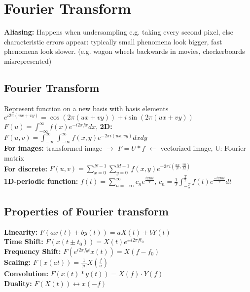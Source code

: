 \section*{Fourier Transform}
\textbf{Aliasing:} Happens when undersampling e.g. taking every second pixel, else characteristic errors appear: typically small phenomena look bigger, fast phenomena look slower. (e.g. wagon wheels backwards in movies, checkerboards misrepresented)
\subsection*{Fourier Transform}
Represent function on a new basis with basis elements $e^{i 2 \pi (ux + vy)} = \cos(2 \pi (ux + vy)) + i \sin(2 \pi (ux + vy))$\\
$F(u) = \int_{-\infty}^{\infty} f(x) e^{-i 2 \pi fx} dx$, \textbf{2D:} $F(u, v) = \int_{-\infty}^{\infty} \int_{-\infty}^{\infty} f(x, y) e^{-2\pi i (ux, vy)}dx dy$\\
\textbf{For images:} transformed image $\rightarrow$ $F = U * f$ $\leftarrow$ vectorized image, U: Fourier matrix\\
\textbf{For discrete:} $F(u, v) = \sum_{x=0}^{N-1} \sum_{y=0}^{M-1} f(x, y) e^{-2\pi i (\frac{ux}{N}, \frac{vy}{M})}$\\
\textbf{1D-periodic function:} $f(t) = \sum_{n = -\infty}^{\infty} c_n e^{\frac{i 2 \pi n t}{T}}$, $c_n = \frac{1}{T} \int_{-\frac{T}{2}}^{\frac{T}{2}} f(t) e^{\frac{-i 2 \pi n t}{T}} dt$\\
\subsection*{Properties of Fourier transform}
\textbf{Linearity:} $F(ax(t) + by(t)) = aX(t) + bY(t)$\\
\textbf{Time Shift:} $F(x(t \pm t_0)) = X(t) e^{\pm i 2 \pi f t_0}$\\
\textbf{Frequency Shift:} $F(e^{i 2 \pi f_0 t} x(t)) = X(f - f_0)$\\
\textbf{Scaling:} $F(x(at)) = \frac{1}{|a|}X\left(\frac{f}{a}\right)$\\
\textbf{Convolution:} $F(x(t) * y(t)) = X(f) \cdot Y(f)$\\
\textbf{Duality:} $F(X(t)) \longleftrightarrow x(-f)$
